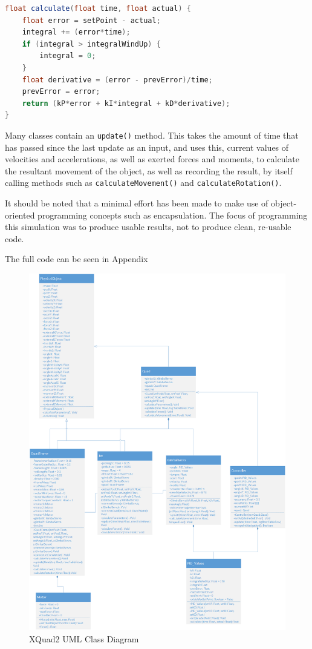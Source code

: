 \documentclass[11pt]{article}
\begin{document}
\begin{lstlisting}[language=Java]
float calculate(float time, float actual) {
    float error = setPoint - actual;
    integral += (error*time);
    if (integral > integralWindUp) {
        integral = 0;
    }
    float derivative = (error - prevError)/time;
    prevError = error;
    return (kP*error + kI*integral + kD*derivative);
}
\end{lstlisting}

Many classes contain an \lstinline|update()| method. This takes the amount of time that has passed since the last update as an input, and uses this, current values of velocities and accelerations, as well as exerted forces and moments, to calculate the resultant movement of the object, as well as recording the result, by itself calling methods such as \lstinline|calculateMovement()| and \lstinline|calculateRotation()|.

It should be noted that a minimal effort has been made to make use of object-oriented programming concepts such as encapsulation. The focus of programming this simulation was to produce usable results, not to produce clean, re-usable code.

The full code can be seen in Appendix

\begin{figure}[p]
    \includegraphics[width=\linewidth]{XQuad_2_Class_Diagram}
    \caption{XQuad2 UML Class Diagram}
    \label{fig:XQuad_2_Class_Diagram}
\end{figure}
\end{document}
